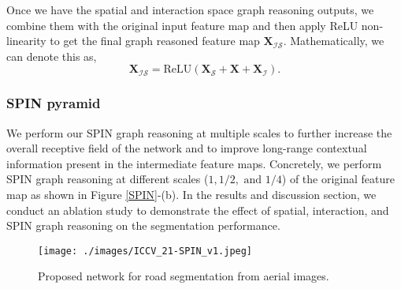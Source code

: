 \documentclass[letterpaper, 10 pt, conference]{ieeeconf}
\begin{document}
 Once we have the spatial and interaction space graph reasoning outputs, we combine them with the original input feature map and then apply ReLU non-linearity to get the final graph reasoned feature map $\boldsymbol{X}_{\mathcal{I}\mathcal{S}}$. Mathematically, we can denote this as,
 \begin{equation}
 \boldsymbol{X}_{\mathcal{I}\mathcal{S}} = \text{ReLU} (\boldsymbol{X}_{\mathcal{S}}+\boldsymbol{X}+\boldsymbol{X}_{\mathcal{I}}).
 \end{equation}





\subsubsection{SPIN pyramid}We perform our SPIN graph reasoning at multiple scales to further increase the overall receptive field of the network and to improve long-range contextual information present in the intermediate feature maps. Concretely, we perform SPIN graph reasoning at different scales ($1, 1/2, \text{ and } 1/4$) of the original feature map as shown in Figure \ref{SPIN}-(b). In the results and discussion section, we conduct an ablation study to demonstrate the effect of spatial, interaction, and SPIN graph reasoning on the segmentation performance.

\begin{figure}[t!]
	\centering
	\texttt{[image: ./images/ICCV\_21-SPIN\_v1.jpeg]}
    \vskip-10pt	
    \caption{Proposed network for road segmentation from aerial images. 
}
	\label{Proposed_network}
	\vspace{-5mm}
\end{figure}
\end{document}
